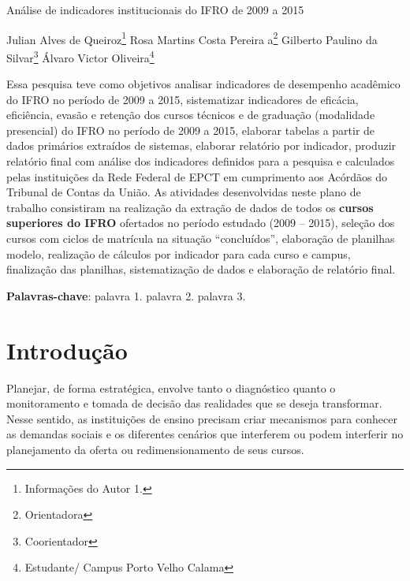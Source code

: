 \documentclass[article,12pt,onesidea,4paper,english,brazil]{abntex2}
\begin{document}
	
	
	\frenchspacing 
	
	\begin{center}
		\LARGE Análise de indicadores institucionais do IFRO de 2009 a 2015
		
		\normalsize
		Julian Alves de Queiroz\footnote{Informações do Autor 1.} 
		Rosa Martins Costa Pereira a\footnote{Orientadora} 
		Gilberto Paulino da Silvar\footnote{Coorientador} 
		Álvaro Victor Oliveira\footnote{Estudante/ Campus Porto Velho Calama} 
	\end{center}
	
	\begin{resumoumacoluna}
		Essa pesquisa teve como objetivos analisar indicadores de desempenho acadêmico do IFRO
		no período de 2009 a 2015, sistematizar indicadores de eficácia, eficiência, evasão e retenção dos
		cursos técnicos e de graduação (modalidade presencial) do IFRO no período de 2009 a 2015,
		elaborar tabelas a partir de dados primários extraídos de sistemas,
		elaborar relatório por indicador, produzir relatório final com análise dos indicadores definidos
		para a pesquisa e calculados pelas instituições da Rede Federal de EPCT em cumprimento aos
		Acórdãos do Tribunal de Contas da União. As atividades desenvolvidas neste plano de trabalho
		consistiram na realização da extração de dados de todos os \textbf{cursos superiores do IFRO} ofertados
		no período estudado (2009 – 2015), seleção dos cursos com ciclos de matrícula na situação
		“concluídos”, elaboração de planilhas modelo, realização de cálculos por indicador para cada
		curso e campus, finalização das planilhas, sistematização de dados e elaboração de relatório final.
		
		\vspace{\onelineskip}
		
		\noindent
		\textbf{Palavras-chave}: palavra 1. palavra 2. palavra 3.
	\end{resumoumacoluna}
	
	\textual
	
	\section*{Introdução}
	
	Planejar, de forma estratégica, envolve tanto o diagnóstico quanto o monitoramento e
	tomada de decisão das realidades que se deseja transformar. Nesse sentido, as instituições de
	ensino precisam criar mecanismos para conhecer as demandas sociais e os diferentes cenários que
	interferem ou podem interferir no planejamento da oferta ou redimensionamento de seus cursos.
	
\end{document}
